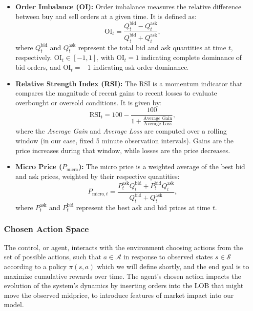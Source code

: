 \begin{itemize}
    \item \textbf{Order Imbalance (OI):} Order imbalance measures the relative difference between buy and sell orders at a given time.
    It is defined as:
    \[
        \text{OI}_t = \frac{Q_t^{\text{bid}} - Q_t^{\text{ask}}}{Q_t^{\text{bid}} + Q_t^{\text{ask}}},
    \]
    where \( Q_t^{\text{bid}} \) and \( Q_t^{\text{ask}} \) represent the total bid and ask quantities at time \( t \), respectively.
    \( \text{OI}_t \in [-1, 1] \), with \( \text{OI}_t = 1 \) indicating complete dominance of bid orders, and \( \text{OI}_t = -1 \) indicating ask order dominance.

    \item \textbf{Relative Strength Index (RSI):} The RSI is a momentum indicator that compares the magnitude of recent gains to recent losses to evaluate overbought or oversold conditions. It is given by:
    \[
        \text{RSI}_t = 100 - \frac{100}{1 + \frac{\text{Average Gain}}{\text{Average Loss}}},
    \]
    where the \textit{Average Gain} and \textit{Average Loss} are computed over a rolling window (in our case, fixed 5 minute observation intervals).
    Gains are the price increases during that window, while losses are the price decreases.

    \item \textbf{Micro Price (\( P_{\text{micro}} \)):} The micro price is a weighted average of the best bid and ask prices, weighted by their respective quantities:
    \[
        P_{\text{micro},t} = \frac{P_t^{\text{ask}} Q_t^{\text{bid}} + P_t^{\text{bid}} Q_t^{\text{ask}}}{Q_t^{\text{bid}} + Q_t^{\text{ask}}},
    \]
    where \( P_t^{\text{ask}} \) and \( P_t^{\text{bid}} \) represent the best ask and bid prices at time \( t \).

\end{itemize}

\subsubsection{Chosen Action Space}

The control, or agent, interacts with the environment choosing actions from the set of possible actions,
such that $a \in \mathcal{A}$ in response to observed states $s \in \mathcal{S}$ according to a policy $\pi (s, a)$ which we will define shortly,
and the end goal is to maximize cumulative rewards over time.
The agent's chosen action impacts the evolution of the system's dynamics by inserting orders into the LOB that might move the observed midprice,
to introduce features of market impact into our model.

